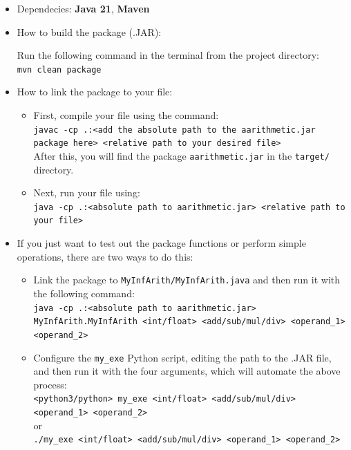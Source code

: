 \documentclass[15pt]{article}
\begin{document}
\begin{itemize}
    \item Dependecies: \textbf{Java 21}, \textbf{Maven}
    \item How to build the package (.JAR):
    
    Run the following command in the terminal from the project directory:\\
    \texttt{mvn clean package}

    \item How to link the package to your file:
    
    \begin{itemize}
        \item First, compile your file using the command:\\
        \texttt{javac -cp .:<add the absolute path to the aarithmetic.jar package here> <relative path to your desired file>}\\
        After this, you will find the package \texttt{aarithmetic.jar} in the \texttt{target/} directory.

        \item Next, run your file using:\\
        \texttt{java -cp .:<absolute path to aarithmetic.jar> <relative path to your file>}
    \end{itemize}

    \item If you just want to test out the package functions or perform simple operations, there are two ways to do this:
    \
    \begin{itemize}
        \item Link the package to \texttt{MyInfArith/MyInfArith.java} and then run it with the following command:\\
        \texttt{java -cp .:<absolute path to aarithmetic.jar> MyInfArith.MyInfArith <int/float> <add/sub/mul/div> <operand\_1> <operand\_2>}

        \item Configure the \texttt{my\_exe} Python script, editing the path to the .JAR file, and then run it with the four arguments, which will automate the above process:\\
        \texttt{<python3/python> my\_exe <int/float> <add/sub/mul/div> <operand\_1> <operand\_2>}\\
        or\\
        \texttt{./my\_exe <int/float> <add/sub/mul/div> <operand\_1> <operand\_2>}


\end{itemize}
\end{itemize}
\end{document}
